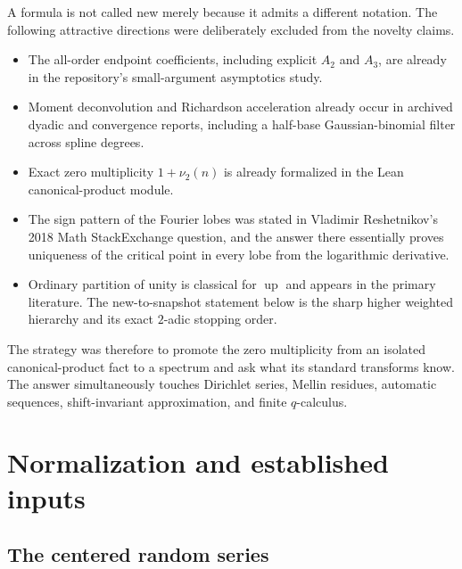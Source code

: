 \documentclass[11pt,oneside]{article}
\numberwithin{equation}{section}
\theoremstyle{definition}
\theoremstyle{remark}
\newcommand{\Up}{\operatorname{up}}
\begin{document}
A formula is not called new merely because it admits a different notation.  The
following attractive directions were deliberately excluded from the novelty
claims.
\begin{itemize}
\item The all-order endpoint coefficients, including explicit $A_2$ and $A_3$,
      are already in the repository's small-argument asymptotics study.
\item Moment deconvolution and Richardson acceleration already occur in archived
      dyadic and convergence reports, including a half-base Gaussian-binomial
      filter across spline degrees.
\item Exact zero multiplicity $1+\nu_2(n)$ is already formalized in the Lean
      canonical-product module.
\item The sign pattern of the Fourier lobes was stated in Vladimir Reshetnikov's
      2018 Math StackExchange question, and the answer there essentially proves
      uniqueness of the critical point in every lobe from the logarithmic
      derivative.
\item Ordinary partition of unity is classical for $\Up$ and appears in the
      primary literature.  The new-to-snapshot statement below is the sharp
      higher weighted hierarchy and its exact $2$-adic stopping order.
\end{itemize}

The strategy was therefore to promote the zero multiplicity from an isolated
canonical-product fact to a spectrum and ask what its standard transforms know.
The answer simultaneously touches Dirichlet series, Mellin residues, automatic
sequences, shift-invariant approximation, and finite $q$-calculus.

\section{Normalization and established inputs}
\label{sec:normalization}

\subsection{The centered random series}
\end{document}
